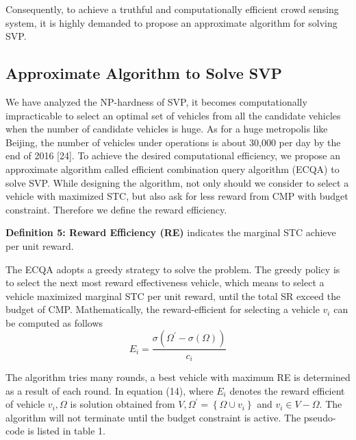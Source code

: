\documentclass[journal]{IEEEtran}
\begin{document}
Consequently, to achieve a truthful and computationally efficient crowd sensing system, it is highly demanded to propose an approximate algorithm for solving SVP.
\subsection{Approximate Algorithm to Solve SVP}
We have analyzed the NP-hardness of SVP, it becomes computationally impracticable to select an optimal set of vehicles from all the candidate vehicles when the number of candidate vehicles is huge. As for a huge metropolis like Beijing, the number of vehicles under operations is about 30,000 per day by the end of 2016 [24]. To achieve the desired computational efficiency, we propose an approximate algorithm called efficient combination query algorithm (ECQA) to solve SVP. While designing the algorithm, not only should we consider to select a vehicle with maximized STC, but also ask for less reward from CMP with budget constraint. Therefore we define the reward efficiency.

\noindent
\textbf{Definition 5: Reward Efficiency (RE)} indicates the marginal STC achieve per unit reward.

The ECQA adopts a greedy strategy to solve the problem. The greedy policy is to select the next most reward effectiveness vehicle, which means to select a vehicle maximized marginal STC per unit reward, until the total SR exceed the budget of CMP. Mathematically, the reward-efficient for selecting a vehicle $v_{i}$ can be computed as follows
\begin{equation}
E_{i}=\frac{\sigma (\Omega ^{'}-\sigma (\Omega))}{c_{i}}
\end{equation}

The algorithm tries many rounds, a best vehicle with maximum RE is determined as a result of each round. In equation (14), where $E_{i}$  denotes the reward efficient of vehicle $v_{i}, \Omega$ is solution obtained from $V, \Omega ^{'}=\left \{ \Omega\cup v_{i}  \right \}$ and $v_{i}\in V-\Omega $. The algorithm will not terminate until the budget constraint is active. The pseudo-code is listed in table 1.
\end{document}
